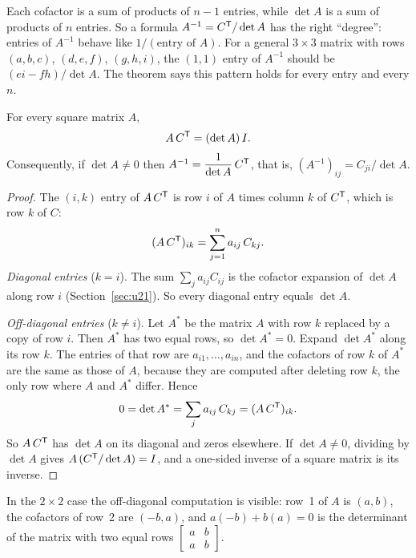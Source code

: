 Each cofactor is a sum of products of $n-1$ entries, while $\det A$ is a sum of products of
$n$ entries. So a formula $A^{-1}=C^{\mathsf{T}}/\det A$ has the right ``degree'': entries of $A^{-1}$
behave like $1/(\text{entry of }A)$. For a general $3\times 3$ matrix with rows
$(a,b,c)$, $(d,e,f)$, $(g,h,i)$, the $(1,1)$ entry of $A^{-1}$ should be
$(ei-fh)/\det A$. The theorem says this pattern holds for every entry and every $n$.

\begin{theorem}\label{thm:u22-inverse}
For every square matrix $A$,
\[
  A\,C^{\mathsf{T}}=(\det A)\,I .
\]
Consequently, if $\det A\neq 0$ then $A^{-1}=\dfrac{1}{\det A}\,C^{\mathsf{T}}$, that is,
$(A^{-1})_{ij}=C_{ji}/\det A$.
\end{theorem}

\begin{proof}
The $(i,k)$ entry of $A\,C^{\mathsf{T}}$ is row $i$ of $A$ times column $k$ of $C^{\mathsf{T}}$, which is row $k$
of $C$:
\[
  (A\,C^{\mathsf{T}})_{ik}=\sum_{j=1}^{n} a_{ij}\,C_{kj}.
\]
\emph{Diagonal entries} ($k=i$). The sum $\sum_j a_{ij}C_{ij}$ is the cofactor expansion of
$\det A$ along row $i$ (Section~\ref{sec:u21}). So every diagonal entry equals $\det A$.

\emph{Off-diagonal entries} ($k\neq i$). Let $A^{*}$ be the matrix $A$ with row $k$
replaced by a copy of row $i$. Then $A^{*}$ has two equal rows, so $\det A^{*}=0$. Expand
$\det A^{*}$ along its row $k$. The entries of that row are $a_{i1},\dots,a_{in}$, and the
cofactors of row $k$ of $A^{*}$ are the same as those of $A$, because they are computed after
deleting row $k$, the only row where $A$ and $A^{*}$ differ. Hence
\[
  0=\det A^{*}=\sum_{j} a_{ij}\,C_{kj}=(A\,C^{\mathsf{T}})_{ik}.
\]
So $A\,C^{\mathsf{T}}$ has $\det A$ on its diagonal and zeros elsewhere. If $\det A\neq 0$, dividing
by $\det A$ gives $A\,(C^{\mathsf{T}}/\det A)=I$, and a one-sided inverse of a square matrix is its
inverse.
\end{proof}

In the $2\times 2$ case the off-diagonal computation is visible: row~1 of $A$ is $(a,b)$,
the cofactors of row~2 are $(-b,a)$, and $a(-b)+b(a)=0$ is the determinant of the matrix
with two equal rows $\left[\begin{smallmatrix} a&b\\ a&b\end{smallmatrix}\right]$.

